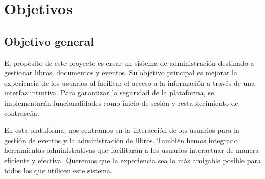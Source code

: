 \documentclass[a4paper, 12pt]{book}
\begin{document}

\cleardoublepage %
\chapter{Objetivos} %
\label{chap:objetivos} %

\section{Objetivo general} %
\label{sec:objetivo-general} %
El propósito de este proyecto es crear un sistema de administración destinado a gestionar libros, documentos y eventos. 
Su objetivo principal es mejorar la experiencia de los usuarios al facilitar el acceso a la información a través de una 
interfaz intuitiva. Para garantizar la seguridad de la plataforma, se implementarán funcionalidades como inicio de sesión 
y restablecimiento de contraseña.

En esta plataforma, nos centramos en la interacción de los usuarios para la gestión de eventos y la administración de libros. 
También hemos integrado herramientas administrativas que facilitarán a los usuarios interactuar de manera eficiente y efectiva. 
Queremos que la experiencia sea lo más amigable posible para todos los que utilicen este sistema.
\end{document}
